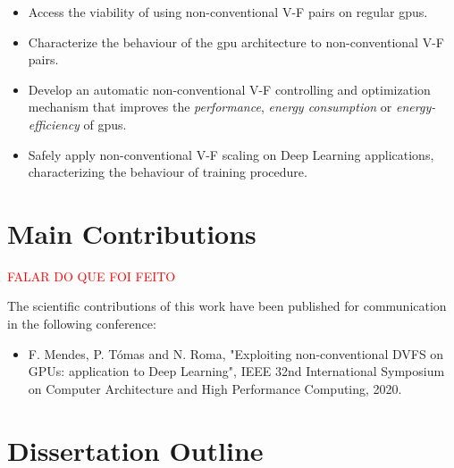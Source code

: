 \begin{itemize}
\item Access the viability of using non-conventional V-F pairs on regular \acrshort{gpu}s.
\item Characterize the behaviour of the \acrshort{gpu} architecture to non-conventional V-F pairs.
\item Develop an automatic non-conventional V-F controlling and optimization mechanism that improves the \textit{performance}, \textit{energy consumption} or \textit{energy-efficiency} of \acrshort{gpu}s.
\item Safely apply non-conventional V-F scaling on Deep Learning applications, characterizing the behaviour of training procedure.
\end{itemize}


\section{Main Contributions}
\label{section:main_contri}


\textcolor{red}{FALAR DO QUE FOI FEITO}

The scientiﬁc contributions of this work have been published for communication in the following conference:

\begin{itemize}
    \item F. Mendes, P. Tómas and N. Roma, "Exploiting non-conventional DVFS on GPUs: application to Deep Learning", IEEE 32nd International Symposium on Computer Architecture and High Performance Computing, 2020.
\end{itemize}


\section{Dissertation Outline}
\label{section:outline}

